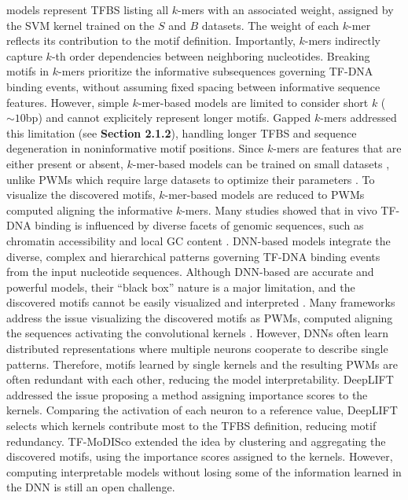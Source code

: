 \documentclass[a4paper, titlepage, openright]{book}
\begin{document}
models represent TFBS listing all $k$-mers with an associated weight, assigned by the SVM kernel trained on the $S$ and $B$ datasets. The weight of each $k$-mer reflects its contribution to the motif definition. Importantly, $k$-mers indirectly capture $k$-th order dependencies between neighboring nucleotides. Breaking motifs in $k$-mers prioritize the informative subsequences governing TF-DNA binding events, without assuming fixed spacing between informative sequence features. However, simple $k$-mer-based models are limited to consider short $k$ ($\sim 10$bp) and cannot explicitely represent longer motifs. Gapped $k$-mers addressed this limitation (see \textbf{Section 2.1.2}), handling longer TFBS and sequence degeneration in noninformative motif positions. Since $k$-mers are features that are either present or absent, $k$-mer-based models can be trained on small datasets \citep{beer2004predicting}, unlike PWMs which require large datasets to optimize their parameters \citep{zhao2011quantitative}. To visualize the discovered motifs, $k$-mer-based models are reduced to PWMs computed aligning the informative $k$-mers. Many studies showed that in vivo TF-DNA binding is influenced by diverse facets of genomic sequences, such as chromatin accessibility \citep{zaret2016pioneer} and local GC content \citep{wang2012sequence}. DNN-based models integrate the diverse, complex and hierarchical patterns governing TF-DNA binding events from the input nucleotide sequences. Although DNN-based are accurate and powerful models, their ``black box'' nature is a major limitation, and the discovered motifs cannot be easily visualized and interpreted \citep{park2020enhancing}. Many frameworks address the issue visualizing the discovered motifs as PWMs, computed aligning the sequences activating the convolutional kernels \citep{koo2020deep}. However, DNNs often learn distributed representations where multiple neurons cooperate to describe single patterns. Therefore, motifs learned by single kernels and the resulting PWMs are often redundant with each other, reducing the model interpretability. DeepLIFT \citep{shrikumar2017learning} addressed the issue proposing a method assigning importance scores to the kernels. Comparing the activation of each neuron to a reference value, DeepLIFT selects which kernels contribute most to the TFBS definition, reducing motif redundancy. TF-MoDISco \citep{avsec2021base} extended the idea by clustering and aggregating the discovered motifs, using the importance scores assigned to the kernels. However, computing interpretable models without losing some of the information learned in the DNN is still an open challenge.
\end{document}
